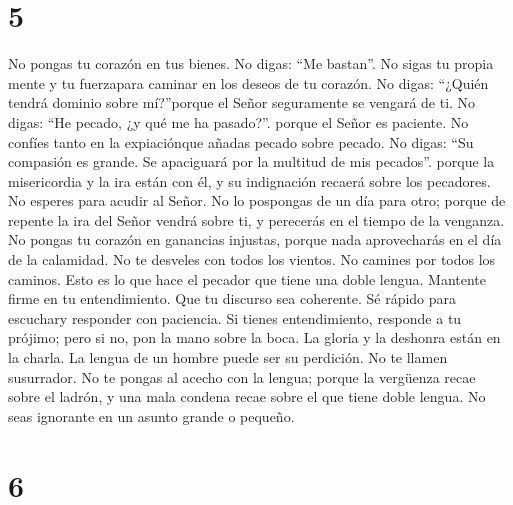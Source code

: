 \hypertarget{section-4}{%
\section{5}\label{section-4}}

 No pongas tu corazón en tus bienes. No digas: ``Me
bastan''.  No sigas tu propia mente y tu fuerzapara
caminar en los deseos de tu corazón.  No digas: ``¿Quién
tendrá dominio sobre mí?''porque el Señor seguramente se vengará de ti.
 No digas: ``He pecado, ¿y qué me ha pasado?''. porque el
Señor es paciente.  No confíes tanto en la expiaciónque
añadas pecado sobre pecado.  No digas: ``Su compasión es
grande. Se apaciguará por la multitud de mis pecados''. porque la
misericordia y la ira están con él, y su indignación recaerá sobre los
pecadores.  No esperes para acudir al Señor. No lo
pospongas de un día para otro; porque de repente la ira del Señor vendrá
sobre ti, y perecerás en el tiempo de la venganza.  No
pongas tu corazón en ganancias injustas, porque nada aprovecharás en el
día de la calamidad.  No te desveles con todos los
vientos. No camines por todos los caminos. Esto es lo que hace el
pecador que tiene una doble lengua.  Mantente firme en tu
entendimiento. Que tu discurso sea coherente.  Sé rápido
para escuchary responder con paciencia.  Si tienes
entendimiento, responde a tu prójimo; pero si no, pon la mano sobre la
boca.  La gloria y la deshonra están en la charla. La
lengua de un hombre puede ser su perdición.  No te llamen
susurrador. No te pongas al acecho con la lengua; porque la vergüenza
recae sobre el ladrón, y una mala condena recae sobre el que tiene doble
lengua.  No seas ignorante en un asunto grande o pequeño.

\hypertarget{section-5}{%
\section{6}\label{section-5}}

